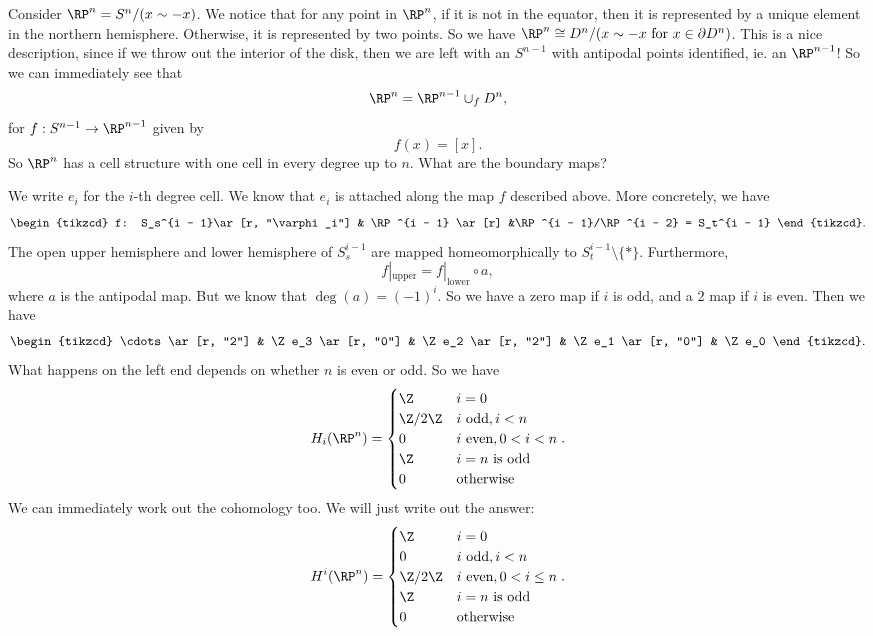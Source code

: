 \documentclass[a4paper]{article}
\theoremstyle{definition}
\begin{document}
\begin{eg}
  Consider $\RP^n = S^n/(x \sim -x)$. We notice that for any point in $\RP^n$, if it is not in the equator, then it is represented by a unique element in the northern hemisphere. Otherwise, it is represented by two points. So we have $\RP^n \cong D^n/(x \sim -x\text{ for }x \in \partial D^n)$. This is a nice description, since if we throw out the interior of the disk, then we are left with an $S^{n - 1}$ with antipodal points identified, ie. an $\RP^{n - 1}$! So we can immediately see that
  \[
    \RP^n = \RP^{n - 1} \cup_f D^n,
  \]
  for $f: S^{n - 1} \to \RP^{n - 1}$ given by
  \[
    f(x) = [x].
  \]
  So $\RP^n$ has a cell structure with one cell in every degree up to $n$. What are the boundary maps?

  We write $e_i$ for the $i$-th degree cell. We know that $e_i$ is attached along the map $f$ described above. More concretely, we have
  \[
    \begin{tikzcd}
      f: S_s^{i - 1}\ar[r, "\varphi_i"] & \RP^{i - 1} \ar[r] &\RP^{i - 1}/\RP^{i - 2} = S_t^{i - 1}
    \end{tikzcd}.
  \]
  The open upper hemisphere and lower hemisphere of $S^{i - 1}_s$ are mapped homeomorphically to $S_t^{i - 1} \setminus \{*\}$. Furthermore,
  \[
    f|_{\mathrm{upper}} = f|_{\mathrm{lower}} \circ a,
  \]
  where $a$ is the antipodal map. But we know that $\deg(a) = (-1)^i$. So we have a zero map if $i$ is odd, and a $2$ map if $i$ is even. Then we have
  \[
    \begin{tikzcd}
      \cdots \ar[r, "2"] & \Z e_3 \ar[r, "0"] & \Z e_2 \ar[r, "2"] & \Z e_1 \ar[r, "0"] & \Z e_0
    \end{tikzcd}.
  \]
  What happens on the left end depends on whether $n$ is even or odd. So we have
  \[
    H_i(\RP^n) =
    \begin{cases}
      \Z & i = 0\\
      \Z/2\Z & i\text{ odd}, i < n\\
      0 & i\text{ even}, 0 < i < n\\
      \Z & i = n\text{ is odd}\\
      0 & \text{otherwise}
    \end{cases}.
  \]
  We can immediately work out the cohomology too. We will just write out the answer:
  \[
    H^i(\RP^n) =
    \begin{cases}
      \Z & i = 0\\
      0 & i\text{ odd}, i < n\\
      \Z/2\Z & i\text{ even}, 0 < i \leq n\\
      \Z & i = n\text{ is odd}\\
      0 & \text{otherwise}
    \end{cases}.
  \]
\end{eg}
\end{document}
